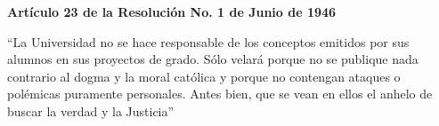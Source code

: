 \noindent \textbf{Artículo 23 de la Resolución No. 1 de Junio de 1946} \\

\vspace{0.25cm}

\noindent “La Universidad no se hace responsable de los conceptos emitidos por sus alumnos en sus proyectos de grado. Sólo velará porque no se publique nada contrario al dogma y la moral católica y porque no contengan ataques o polémicas puramente personales. Antes bien, que se vean en ellos el anhelo de buscar la verdad y la Justicia”
